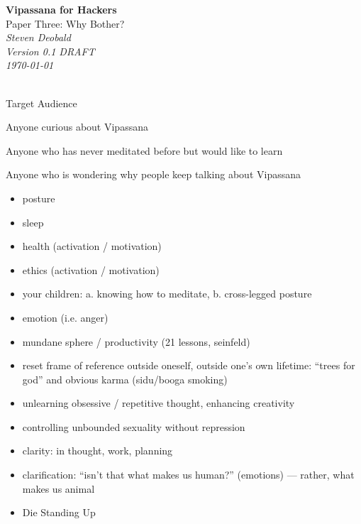 \documentclass{article}
\begin{document}
\begin{titlepage}
   \begin{center}
     \Huge\textbf{Vipassana for Hackers}\\
     \Huge{Paper Three: Why Bother?}\\
     \vspace{5cm}
     \large\textit{Steven Deobald}\\
     \large\textit{Version 0.1 DRAFT}\\
     \large\textit\today\\
     \vspace{5cm}
     \large\textit{}\\
   \end{center}
\end{titlepage}

\begin{center}
  \Huge{Target Audience}
\end{center}

Anyone curious about Vipassana

Anyone who has never meditated before but would like to learn

Anyone who is wondering why people keep talking about Vipassana

\begin{itemize}
  \item posture
  \item sleep
  \item health (activation / motivation)
  \item ethics (activation / motivation)
  \item your children: a. knowing how to meditate, b. cross-legged posture
  \item emotion (i.e. anger)
  \item mundane sphere / productivity (21 lessons, seinfeld)
  \item reset frame of reference outside oneself, outside one's own lifetime: ``trees for god'' and obvious karma (sidu/booga smoking)
  \item unlearning obsessive / repetitive thought, enhancing creativity
  \item controlling unbounded sexuality without repression
  \item clarity: in thought, work, planning
  \item clarification: ``isn't that what makes us human?'' (emotions) --- rather, what makes us animal
  \item Die Standing Up

\end{itemize}
\end{document}
